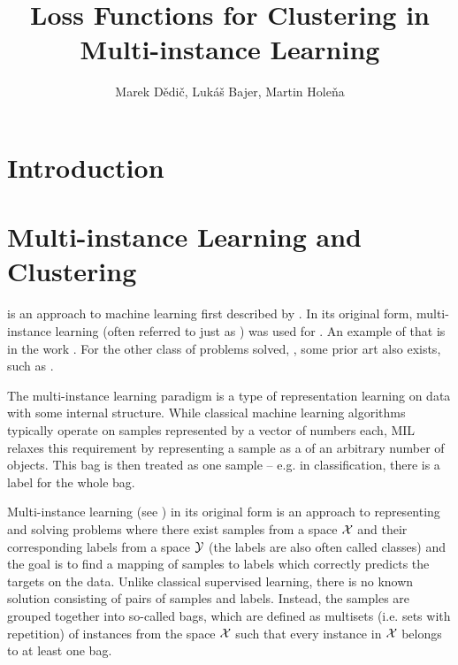 

\title{Loss Functions for Clustering in Multi-instance Learning}
\author{Marek Dědič, Lukáš Bajer, Martin Holeňa}



\twocolumn[\maketitle]

\begin{abstract}

\end{abstract}


\section{Introduction}


\section{Multi-instance Learning and Clustering}

 is an approach to machine learning first described by \cite{dietterich_solving_1997}. In its original form, multi-instance learning (often referred to just as ) was used for . An example of that is in the work \cite{amores_multiple_2013}. For the other class of problems solved, , some prior art also exists, such as \cite{chen_contextual_2012}.

The multi-instance learning paradigm is a type of representation learning on data with some internal structure. While classical machine learning algorithms typically operate on samples represented by a vector of numbers each, MIL relaxes this requirement by representing a sample as a  of an arbitrary number of objects. This bag is then treated as one sample -- e.g. in classification, there is a label for the whole bag.

Multi-instance learning (see \cite{dietterich_solving_1997}) in its original form is an approach to representing and solving problems where there exist samples from a space \( \mathcal{X} \) and their corresponding labels from a space \( \mathcal{Y} \) (the labels are also often called classes) and the goal is to find a mapping of samples to labels which correctly predicts the targets on the data. Unlike classical supervised learning, there is no known solution consisting of pairs of samples and labels. Instead, the samples are grouped together into so-called bags, which are defined as multisets (i.e. sets with repetition) of instances from the space \( \mathcal{X} \) such that every instance in \( \mathcal{X} \) belongs to at least one bag.

